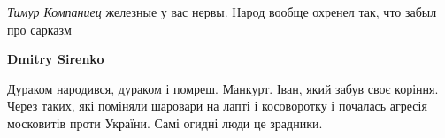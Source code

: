 \begin{itemize}
\begin{itemize}
 

\emph{Тимур Компаниец} железные у вас нервы. Народ вообще охренел так, что забыл про сарказм 🤣

 
\textbf{Dmitry Sirenko} 

Дураком народився, дураком і помреш. Манкурт. Іван, який
забув своє коріння. Через таких, які поміняли шаровари на лапті і косоворотку і
почалась агресія московитів проти України. Самі огидні люди це зрадники.

\end{itemize}

\end{itemize}

